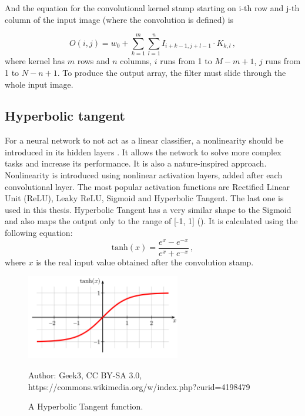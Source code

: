 And the equation for the convolutional kernel stamp starting on i-th row and j-th column of the input image (where the convolution is defined) is

\begin{equation}
	O(i, j) = w_0 + \sum\limits_{k=1}^m \sum\limits_{l=1}^n I_{i+k-1, j+l-1}\cdot K_{k, l} \,,
\end{equation}
where kernel has $m$ rows and $n$ columns, $i$ runs from 1 to $M-m+1$, $j$ runs from 1 to $N-n+1$. To produce the output array, the filter must slide through the whole input image.


\subsection{Hyperbolic tangent}

For a neural network to not act as a linear classifier, a nonlinearity should be introduced in its hidden layers \cite{sharma2017activation}. It allows the network to solve more complex tasks and increase its performance. It is also a nature-inspired approach. Nonlinearity is introduced using nonlinear activation layers, added after each convolutional layer. The most popular activation functions are Rectified Linear Unit (ReLU), Leaky ReLU, Sigmoid and Hyperbolic Tangent. The last one is used in this thesis. Hyperbolic Tangent has a very similar shape to the Sigmoid and also maps the output only to the range of [-1, 1] (). It is calculated using the following equation:
\begin{equation}
	\textrm{tanh}(x) = \frac{e^x-e^{-x}}{e^x+e^{-x}}\,,
\end{equation}
where $x$ is the real input value obtained after the convolution stamp.

\begin{figure}[!h]
  \centering
  \includegraphics[width=0.6\textwidth]{./fig/photos/hyperbolic_tangent.png}

  \caption{A Hyperbolic Tangent function.}
  Author: Geek3, CC BY-SA 3.0, https://commons.wikimedia.org/w/index.php?curid=4198479
  \label{fig:htangent}
\end{figure}



